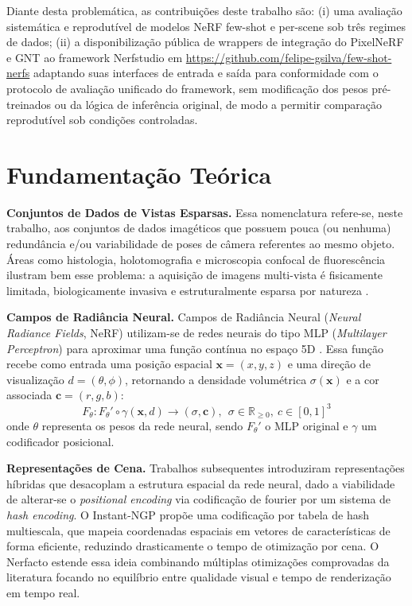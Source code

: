 \documentclass[12pt]{article}
\begin{document}
Diante desta problemática, as contribuições deste trabalho são: (i) uma avaliação sistemática e reprodutível de modelos NeRF few-shot e per-scene sob três regimes de dados; (ii) a disponibilização pública de wrappers de integração do PixelNeRF e GNT ao framework Nerfstudio em \url{https://github.com/felipe-gsilva/few-shot-nerfs} adaptando suas interfaces de entrada e saída para conformidade com o protocolo de avaliação unificado do framework, sem modificação dos pesos pré-treinados ou da lógica de inferência original, de modo a permitir comparação reprodutível sob condições controladas.

\section{Fundamentação Teórica}
\label{sec:fund}

\textbf{Conjuntos de Dados de Vistas Esparsas.} Essa nomenclatura refere-se, neste trabalho, aos conjuntos de dados imagéticos que possuem pouca (ou nenhuma) redundância e/ou variabilidade de poses de câmera referentes ao mesmo objeto. Áreas como histologia, holotomografia e microscopia confocal de fluorescência ilustram bem esse problema: a aquisição de imagens multi-vista é fisicamente limitada, biologicamente invasiva e estruturalmente esparsa por natureza \cite{XUE2021101816}.


\textbf{Campos de Radiância Neural.} Campos de Radiância Neural (\textit{Neural Radiance Fields}, NeRF) utilizam-se de redes neurais do tipo MLP (\textit{Multilayer Perceptron}) para aproximar uma função contínua no espaço 5D \cite{mildenhall2020nerfrepresentingscenesneural}. 
Essa função recebe como entrada uma posição espacial $\mathbf{x} = (x, y, z)$ e uma direção de visualização $d = (\theta, \phi)$, retornando a densidade volumétrica $\sigma(\mathbf{x})$ e a cor associada $\mathbf{c} = (r, g, b)$:
\[
  F_\theta : F_\theta\prime \circ \gamma(\mathbf{x}, d) \rightarrow (\sigma, \mathbf{c}) ,\ \ \sigma \in \mathbb{R}_{\geq0},\ c \in [0, 1]^3
\]
onde $\theta$ representa os pesos da rede neural, sendo $F_\theta\prime$ o MLP original e $\gamma$ um codificador posicional.

\textbf{Representações de Cena.} Trabalhos subsequentes introduziram representações híbridas que desacoplam a estrutura espacial da rede neural, dado a viabilidade de alterar-se o \textit{positional encoding} via codificação de fourier por um sistema de \textit{hash encoding}. O Instant-NGP \cite{muller2022} propõe uma codificação por tabela de hash multiescala, que mapeia coordenadas espaciais em vetores de características de forma eficiente, reduzindo drasticamente o tempo de otimização por cena. O Nerfacto \cite{Tancik2023} estende essa ideia combinando múltiplas otimizações comprovadas da literatura focando no equilíbrio entre qualidade visual e tempo de renderização em tempo real.
\end{document}
